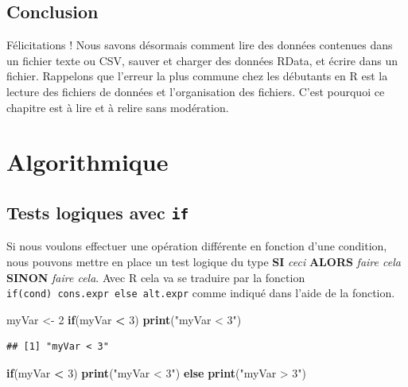 \documentclass[]{book}
\newenvironment{Shaded}{\begin{snugshade}}{\end{snugshade}}
\newcommand{\ControlFlowTok}[1]{\textcolor[rgb]{0.13,0.29,0.53}{\textbf{#1}}}
\newcommand{\DecValTok}[1]{\textcolor[rgb]{0.00,0.00,0.81}{#1}}
\newcommand{\KeywordTok}[1]{\textcolor[rgb]{0.13,0.29,0.53}{\textbf{#1}}}
\newcommand{\NormalTok}[1]{#1}
\newcommand{\OperatorTok}[1]{\textcolor[rgb]{0.81,0.36,0.00}{\textbf{#1}}}
\newcommand{\StringTok}[1]{\textcolor[rgb]{0.31,0.60,0.02}{#1}}
\begin{document}
\hypertarget{conclusion-5}{%
\section{Conclusion}\label{conclusion-5}}

Félicitations ! Nous savons désormais comment lire des données contenues dans un fichier texte ou CSV, sauver et charger des données RData, et écrire dans un fichier. Rappelons que l'erreur la plus commune chez les débutants en R est la lecture des fichiers de données et l'organisation des fichiers. C'est pourquoi ce chapitre est à lire et à relire sans modération.

\hypertarget{algo}{%
\chapter{Algorithmique}\label{algo}}

\hypertarget{l17if}{%
\section{\texorpdfstring{Tests logiques avec \texttt{if}}{Tests logiques avec if}}\label{l17if}}

Si nous voulons effectuer une opération différente en fonction d'une condition, nous pouvons mettre en place un test logique du type \textbf{SI} \emph{ceci} \textbf{ALORS} \emph{faire cela} \textbf{SINON} \emph{faire cela}. Avec R cela va se traduire par la fonction \texttt{if(cond)\ cons.expr\ else\ alt.expr} comme indiqué dans l'aide de la fonction.

\begin{Shaded}
\begin{Highlighting}[]
\NormalTok{myVar <-}\StringTok{ }\DecValTok{2}
\ControlFlowTok{if}\NormalTok{(myVar }\OperatorTok{<}\StringTok{ }\DecValTok{3}\NormalTok{) }\KeywordTok{print}\NormalTok{(}\StringTok{"myVar < 3"}\NormalTok{)}
\end{Highlighting}
\end{Shaded}

\begin{verbatim}
## [1] "myVar < 3"
\end{verbatim}

\begin{Shaded}
\begin{Highlighting}[]
\ControlFlowTok{if}\NormalTok{(myVar }\OperatorTok{<}\StringTok{ }\DecValTok{3}\NormalTok{) }\KeywordTok{print}\NormalTok{(}\StringTok{"myVar < 3"}\NormalTok{) }\ControlFlowTok{else} \KeywordTok{print}\NormalTok{(}\StringTok{"myVar > 3"}\NormalTok{)}
\end{Highlighting}
\end{Shaded}
\end{document}

